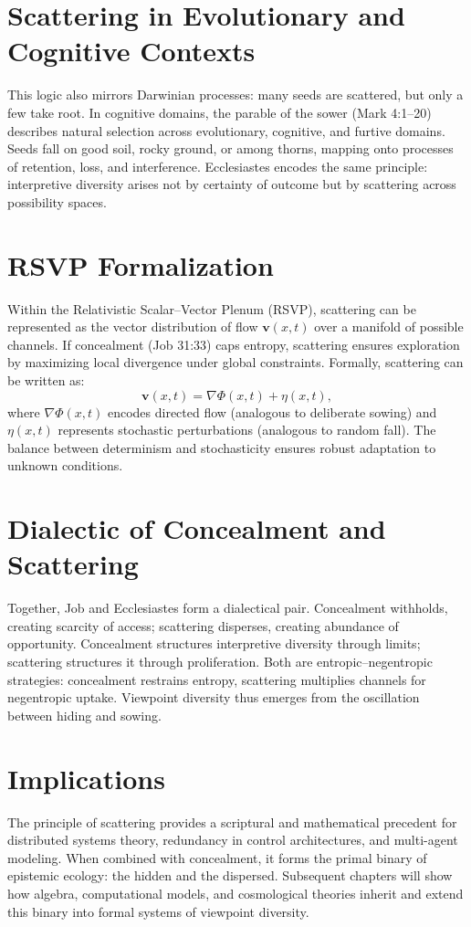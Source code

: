 \documentclass[a4paper,11pt,openany]{book}
\begin{document}
\section{Scattering in Evolutionary and Cognitive Contexts}
This logic also mirrors Darwinian processes: many seeds are scattered, but only a few take root. In cognitive domains, the parable of the sower (Mark 4:1–20) describes natural selection across evolutionary, cognitive, and furtive domains. Seeds fall on good soil, rocky ground, or among thorns, mapping onto processes of retention, loss, and interference. Ecclesiastes encodes the same principle: interpretive diversity arises not by certainty of outcome but by scattering across possibility spaces.

\section{RSVP Formalization}
Within the Relativistic Scalar–Vector Plenum (RSVP), scattering can be represented as the vector distribution of flow $\mathbf{v}(x,t)$ over a manifold of possible channels. If concealment (Job 31:33) caps entropy, scattering ensures exploration by maximizing local divergence under global constraints. Formally, scattering can be written as:
\[
\mathbf{v}(x,t) = \nabla \Phi(x,t) + \eta(x,t),
\]
where $\nabla \Phi(x,t)$ encodes directed flow (analogous to deliberate sowing) and $\eta(x,t)$ represents stochastic perturbations (analogous to random fall). The balance between determinism and stochasticity ensures robust adaptation to unknown conditions.

\section{Dialectic of Concealment and Scattering}
Together, Job and Ecclesiastes form a dialectical pair. Concealment withholds, creating scarcity of access; scattering disperses, creating abundance of opportunity. Concealment structures interpretive diversity through limits; scattering structures it through proliferation. Both are entropic–negentropic strategies: concealment restrains entropy, scattering multiplies channels for negentropic uptake. Viewpoint diversity thus emerges from the oscillation between hiding and sowing.

\section{Implications}
The principle of scattering provides a scriptural and mathematical precedent for distributed systems theory, redundancy in control architectures, and multi-agent modeling. When combined with concealment, it forms the primal binary of epistemic ecology: the hidden and the dispersed. Subsequent chapters will show how algebra, computational models, and cosmological theories inherit and extend this binary into formal systems of viewpoint diversity.
\end{document}
